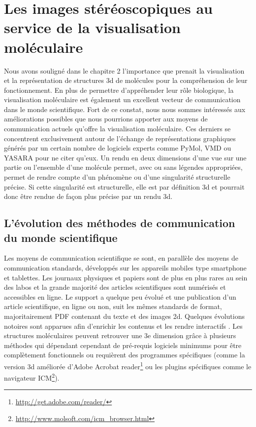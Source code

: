 \section{Les images stéréoscopiques au service de la visualisation moléculaire}

Nous avons souligné dans le chapitre 2 l'importance que prenait la visualisation et la représentation de structures 3d de molécules pour la compréhension de leur fonctionnement. En plus de permettre d'appréhender leur rôle biologique, la visualisation moléculaire est également un excellent vecteur de communication dans le monde scientifique. Fort de ce constat, nous nous sommes intéressés aux améliorations possibles que nous pourrions apporter aux moyens de communication actuels qu'offre la visualisation moléculaire. Ces derniers se concentrent exclusivement autour de l'échange de représentations graphiques générés par un certain nombre de logiciels experts comme PyMol, VMD ou YASARA pour ne citer qu'eux. Un rendu en deux dimensions d'une vue sur une partie ou l'ensemble d'une molécule permet, avec ou sans légendes appropriées, permet de rendre compte d'un phénomène ou d'une singularité structurelle précise. Si cette singularité est structurelle, elle est par définition 3d et pourrait donc être rendue de façon plus précise par un rendu 3d.

\subsection{L'évolution des méthodes de communication du monde scientifique}

Les moyens de communication scientifique se sont, en parallèle des moyens de communication standards, développés sur les appareils mobiles type smartphone et tablettes. Les journaux physiques et papiers sont de plus en plus rares au sein des labos et la grande majorité des articles scientifiques sont numérisés et accessibles en ligne. Le support a quelque peu évolué et une publication d'un article scientifique, en ligne ou non, suit les mêmes standards de format, majoritairement PDF contenant du texte et des images 2d. Quelques évolutions notoires sont apparues afin d'enrichir les contenus et les rendre interactifs \cite{attwood2010utopia}. Les structures moléculaires peuvent retrouver une 3e dimension grâce à plusieurs méthodes \cite{kumar2008grasping,raush2009new} qui dépendant cependant de pré-requis logiciels minimums pour être complètement fonctionnels ou requièrent des programmes spécifiques (comme la version 3d améliorée d'Adobe Acrobat reader\footnote{\url{http://get.adobe.com/reader/}} ou les plugins spécifiques comme le navigateur ICM\footnote{\url{http://www.molsoft.com/icm_browser.html}}).

